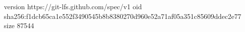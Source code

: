 version https://git-lfs.github.com/spec/v1
oid sha256:f1dcb65ca1e552f3490545b8b8380270d960e52a71af05a351c85609ddec2e77
size 87544
